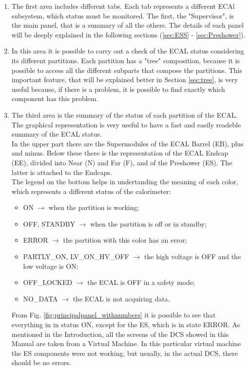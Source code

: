 \documentclass[12pt]{article}
\begin{document}
\begin{enumerate}
	\item The first area includes different tabs. Each tab represents a different ECAl subsystem, which status must be monitored. The first, the "Supervisor", is the main panel, that is a summary of all the others. The details of each panel will be deeply explained in the following sections (\ref{sec:ESS} - \ref{sec:Preshower}).
	\item In this area it is possible to carry out a check of the ECAL status considering its different partitions. Each partition has a "tree" composition, because it is possible to access all the different subparts that compose the partitions. This important feature, that will be explained better in Section \ref{sec:tree}, is very useful because, if there is a problem, it is possible to find exactly which component has this problem. 
	\item The third area is the summary of the status of each partition of the ECAL. The graphical representation is very useful to have a fast and easily readeble summary of the ECAL status. \\
	In the upper part there are the Supermodules of the ECAL Barrel (EB), plus and minus. Below these there is the representation of the ECAL Endcap (EE), divided into Near (N) and Far (F), and of the Preshower (ES). The latter is attached to the Endcaps. \\
	The legend on the bottom helps in undertanding the meaning of each color, which represents a different status of the calorimeter:
	\begin{itemize}
		\item ON $\rightarrow$ when the partition is working;
		\item OFF, STANDBY $\rightarrow$ when the partition is off or in standby;
		\item ERROR $\rightarrow$ the partition with this color has an error;
		\item PARTLY\_ON, LV\_ON\_HV\_OFF $\rightarrow$ the high voltage is OFF and the low voltage is ON;
		\item OFF\_LOCKED $\rightarrow$ the ECAL is OFF in a safety mode;
		\item NO\_DATA $\rightarrow$ the ECAL is not acquiring data.
	\end{itemize}

From Fig. \ref{fig:principalpanel_withnumbers} it is possible to see that everything in in status ON, except for the ES, which is in state ERROR. As mentioned in the Introduction, all the screens of the DCS showed in this Manual are taken from a Virtual Machine. In this particular virtual machine the ES components were not working, but usually, in the actual DCS, there should be no errors. 
\end{enumerate}
\end{document}
